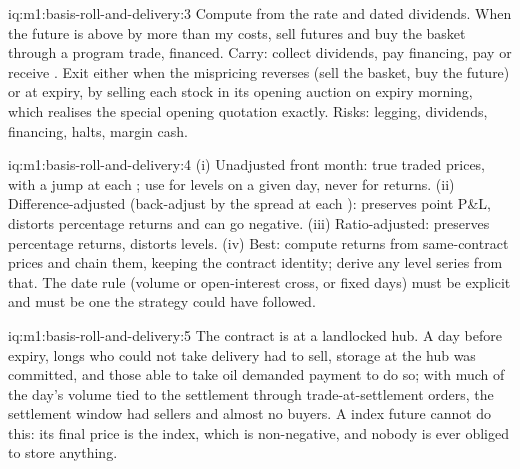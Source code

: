 \begin{solution}{iq:m1:basis-roll-and-delivery:3}
Compute  from the rate and dated dividends. When the future is
above  by more than my costs, sell futures and buy the basket
through a program trade, financed. Carry: collect dividends, pay financing,
pay or receive . Exit either when the mispricing reverses
(sell the basket, buy the future) or at expiry, by selling each stock in its
opening auction on expiry morning, which realises the special opening
quotation exactly. Risks: legging, dividends, financing, halts, margin cash.
\end{solution}

\begin{solution}{iq:m1:basis-roll-and-delivery:4}
(i) Unadjusted front month: true traded prices, with a jump at each ; use
for levels on a given day, never for returns. (ii) Difference-adjusted
(back-adjust by the spread at each ): preserves point P\&L, distorts
percentage returns and can go negative. (iii) Ratio-adjusted: preserves
percentage returns, distorts levels. (iv) Best: compute returns from
same-contract prices and chain them, keeping the contract identity; derive
any level series from that. The  date rule (volume or open-interest
cross, or fixed days) must be explicit and must be one the strategy could
have followed.
\end{solution}

\begin{solution}{iq:m1:basis-roll-and-delivery:5}
The contract is  at a landlocked hub. A day before
expiry, longs who could not take delivery had to sell, storage at the hub was
committed, and those able to take oil demanded payment to do so; with much
of the day's volume tied to the settlement through trade-at-settlement
orders, the settlement window had sellers and almost no buyers. A
 index future cannot do this: its final price is the index,
which is non-negative, and nobody is ever obliged to store anything.
\end{solution}

